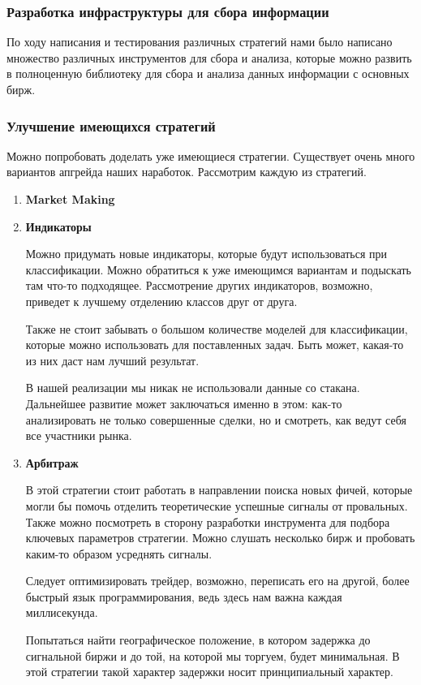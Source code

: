 \subsubsection{Разработка инфраструктуры для сбора информации}
По ходу написания и тестирования различных стратегий нами было написано множество различных инструментов для сбора и анализа, которые можно развить в полноценную библиотеку для сбора и анализа данных информации с основных бирж.
\subsubsection{Улучшение имеющихся стратегий}
Можно попробовать доделать уже имеющиеся стратегии. Существует очень много вариантов апгрейда наших наработок. Рассмотрим каждую из стратегий.
\begin{enumerate}
    \item \textbf{Market Making}
    \item \textbf{Индикаторы}
    
    Можно придумать новые индикаторы, которые будут использоваться при классификации. Можно обратиться к уже имеющимся вариантам и подыскать там что-то подходящее. Рассмотрение других индикаторов, возможно, приведет к лучшему отделению классов друг от друга. 
    
    Также не стоит забывать о большом количестве моделей для классификации, которые можно использовать для поставленных задач. Быть может, какая-то из них даст нам лучший результат.
    
    В нашей реализации мы никак не использовали данные со стакана. Дальнейшее развитие может заключаться именно в этом: как-то анализировать не только совершенные сделки, но и смотреть, как ведут себя все участники рынка.
    \item \textbf{Арбитраж}
    
    В этой стратегии стоит работать в направлении поиска новых фичей, которые могли бы помочь отделить теоретические успешные сигналы от провальных. Также можно посмотреть в сторону разработки инструмента для подбора ключевых параметров стратегии. Можно слушать несколько бирж и пробовать каким-то образом усреднять сигналы. 
    
    Следует оптимизировать трейдер, возможно, переписать его на другой, более быстрый язык программирования, ведь здесь нам важна каждая миллисекунда.
    
    Попытаться найти географическое положение, в котором задержка до сигнальной биржи и до той, на которой мы торгуем, будет минимальная. В этой стратегии такой характер задержки носит принципиальный характер.
\end{enumerate}

